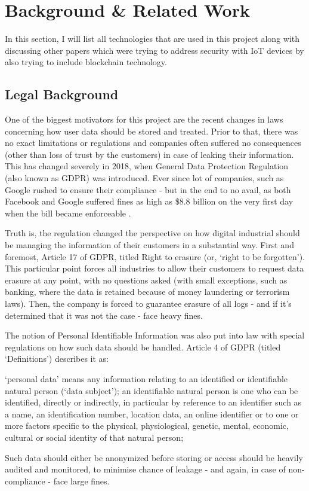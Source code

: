 \chapter{Background \& Related Work}
In this section, I will list all technologies that are used in this project along with discussing other papers which were trying to address security with IoT devices by also trying to include blockchain technology.
\section{Legal Background}
One of the biggest motivators for this project are the recent changes in laws concerning how user data should be stored and treated. Prior to that, there was no exact limitations or regulations and companies often suffered no consequences (other than loss of trust by the customers) in case of leaking their information. This has changed severely in 2018, when General Data Protection Regulation (also known as GDPR) was introduced. Ever since lot of companies, such as Google rushed to ensure their compliance - but in the end to no avail, as both Facebook and Google suffered fines as high as \$8.8 billion on the very first day when the bill became enforceable \citep{brandom2018facebook}.

Truth is, the regulation changed the perspective on how digital industrial should be managing the information of their customers in a substantial way. First and foremost, Article 17 of GDPR, titled Right to erasure (or, `right to be forgotten'). This particular point forces all industries to allow their customers to request data erasure at any point, with no questions asked (with small exceptions, such as banking, where the data is retained because of money laundering or terrorism laws). Then, the company is forced to guarantee erasure of all logs - and if it's determined that it was not the case - face heavy fines.

The notion of Personal Identifiable Information was also put into law with special regulations on how such data should be handled. Article 4 of GDPR (titled `Definitions') describes it as:
\begin{displayquote}
‘personal data’ means any information relating to an identified or identifiable natural person (‘data subject’); an identifiable natural person is one who can be identified, directly or indirectly, in particular by reference to an identifier such as a name, an identification number, location data, an online identifier or to one or more factors specific to the physical, physiological, genetic, mental, economic, cultural or social identity of that natural person;
\end{displayquote}
Such data should either be anonymized before storing or access should be heavily audited and monitored, to minimise chance of leakage - and again, in case of non-compliance - face large fines.


